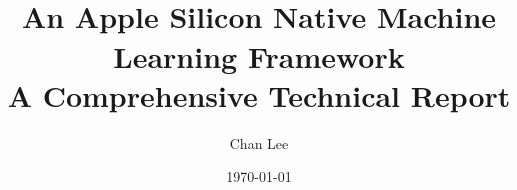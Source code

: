 \documentclass[
  11pt,
  a4paper,
  twoside,
  openany,
  final,
  extrafontsizes,
]{memoir}
\title{\textbf{\Lucid}\\[0.4em]
\Large An Apple Silicon Native Machine Learning Framework\\[0.2em]
\large A Comprehensive Technical Report}
\author{Chan Lee}
\date{\today}
\begin{document}

\raggedbottom

\frontmatter



\tableofcontents*
\clearpage
\listoffigures
\clearpage
\listoftables
\clearpage






\mainmatter










































\end{document}
